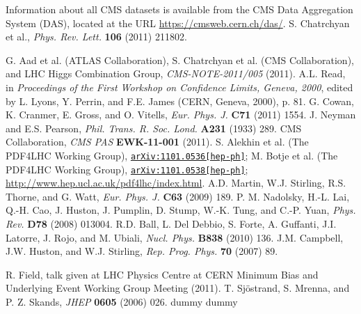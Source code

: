 \documentclass[12pt, letterpaper]{report}
\begin{document}
\begin{thebibliography}{99}

 Information about all CMS datasets is available from the CMS Data Aggregation System (DAS), located at the URL \url{https://cmsweb.cern.ch/das/}.
 S. Chatrchyan et al., \textit{Phys. Rev. Lett.} \textbf{106} (2011) 211802.


 G. Aad et al. (ATLAS Collaboration), S. Chatrchyan et al. (CMS Collaboration), and LHC Higgs Combination Group, \textit{CMS-NOTE-2011/005} (2011).
 A.L. Read, in \textit{Proceedings of the First Workshop on Confidence Limits, Geneva, 2000}, edited by L. Lyons, Y. Perrin, and F.E. James (CERN, Geneva, 2000), p. 81.
 G. Cowan, K. Cranmer, E. Gross, and O. Vitells, \textit{Eur. Phys. J.} \textbf{C71} (2011) 1554.
 J. Neyman and E.S. Pearson, \textit{Phil. Trans. R. Soc. Lond.} \textbf{A231} (1933) 289.
 CMS Collaboration, \textit{CMS PAS} \textbf{EWK-11-001} (2011).
 S. Alekhin et al. (The PDF4LHC Working Group), \href{http://arxiv.org/abs/1101.0536}{\texttt{arXiv:1101.0536[hep-ph]}}; M. Botje et al. (The PDF4LHC Working Group), \href{http://arxiv.org/abs/1101.0538}{\texttt{arXiv:1101.0538[hep-ph]}}; \url{http://www.hep.ucl.ac.uk/pdf4lhc/index.html}.
 A.D. Martin, W.J. Stirling, R.S. Thorne, and G. Watt, \textit{Eur. Phys. J.} \textbf{C63} (2009) 189.
 P. M. Nadolsky, H.-L. Lai, Q.-H. Cao, J. Huston, J. Pumplin, D. Stump, W.-K. Tung, and C.-P. Yuan, \textit{Phys. Rev.} \textbf{D78} (2008) 013004.
 R.D. Ball, L. Del Debbio, S. Forte, A. Guffanti, J.I. Latorre, J. Rojo, and M. Ubiali, \textit{Nucl. Phys.} \textbf{B838} (2010) 136.
 J.M. Campbell, J.W. Huston, and W.J. Stirling, \textit{Rep. Prog. Phys.} \textbf{70} (2007) 89.


 R. Field, talk given at LHC Physics Centre at CERN Minimum Bias and Underlying Event Working Group Meeting (2011).
 T. Sj\"ostrand, S. Mrenna, and P. Z. Skands, \textit{JHEP} \textbf{0605} (2006) 026.
 dummy
 dummy
\end{thebibliography}
\end{document}
